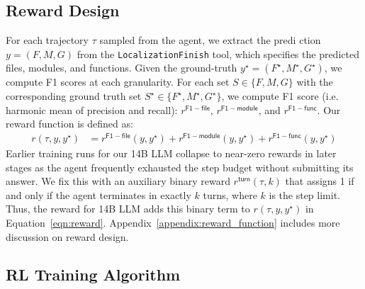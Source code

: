 \subsection{Reward Design}\label{sec:reward_design}
For each trajectory $\tau$ sampled from the agent, we extract the predi ction $y = (F, M, G)$ from the \texttt{LocalizationFinish} tool, which specifies the predicted files, modules, and functions. Given the ground-truth $y^{\star} = (F^{\star}, M^{\star}, G^{\star})$, we compute F1 scores at each granularity. For each set $S \in \{F, M, G\}$ with the corresponding ground truth set $S^{\star} \in \{F^{\star}, M^{\star}, G^{\star}\}$, we compute F1 score (i.e. harmonic mean of precision and recall): $r^{\mathsf{F1-file}}$, $r^{\mathsf{F1-module}}$, and $r^{\mathsf{F1-func}}$. Our reward function is defined as:
\begin{equation}
\begin{aligned}
    r(\tau, y, y^{\star}) &= r^{\mathsf{F1-file}}(y, y^{\star}) + r^{\mathsf{F1-module}}(y, y^{\star}) + r^{\mathsf{F1-func}}(y, y^{\star})
\end{aligned}
\label{eqn:reward}
\end{equation}
Earlier training runs for our 14B LLM collapse to near-zero rewards in later stages as the agent frequently exhausted the step budget without submitting its answer. We fix this with an auxiliary binary reward $r^{\mathsf{turn}}(\tau, k)$ that assigns 1 if and only if the agent terminates in exactly $k$ turns, where $k$ is the step limit. Thus, the reward for 14B LLM adds this binary term to $r(\tau, y, y^{\star})$ in Equation~\ref{eqn:reward}. Appendix~\ref{appendix:reward_function} includes more discussion on reward design.

\subsection{RL Training Algorithm}\label{sec:train_algo}

